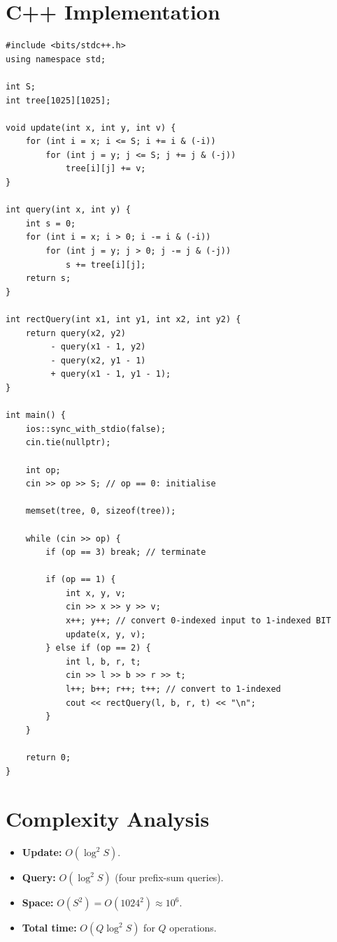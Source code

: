 \documentclass[11pt,a4paper]{article}
\begin{document}
\section{C++ Implementation}

\begin{lstlisting}
#include <bits/stdc++.h>
using namespace std;

int S;
int tree[1025][1025];

void update(int x, int y, int v) {
    for (int i = x; i <= S; i += i & (-i))
        for (int j = y; j <= S; j += j & (-j))
            tree[i][j] += v;
}

int query(int x, int y) {
    int s = 0;
    for (int i = x; i > 0; i -= i & (-i))
        for (int j = y; j > 0; j -= j & (-j))
            s += tree[i][j];
    return s;
}

int rectQuery(int x1, int y1, int x2, int y2) {
    return query(x2, y2)
         - query(x1 - 1, y2)
         - query(x2, y1 - 1)
         + query(x1 - 1, y1 - 1);
}

int main() {
    ios::sync_with_stdio(false);
    cin.tie(nullptr);

    int op;
    cin >> op >> S; // op == 0: initialise

    memset(tree, 0, sizeof(tree));

    while (cin >> op) {
        if (op == 3) break; // terminate

        if (op == 1) {
            int x, y, v;
            cin >> x >> y >> v;
            x++; y++; // convert 0-indexed input to 1-indexed BIT
            update(x, y, v);
        } else if (op == 2) {
            int l, b, r, t;
            cin >> l >> b >> r >> t;
            l++; b++; r++; t++; // convert to 1-indexed
            cout << rectQuery(l, b, r, t) << "\n";
        }
    }

    return 0;
}
\end{lstlisting}

\section{Complexity Analysis}
\begin{itemize}
  \item \textbf{Update:} $O(\log^2 S)$.
  \item \textbf{Query:} $O(\log^2 S)$ (four prefix-sum queries).
  \item \textbf{Space:} $O(S^2) = O(1024^2) \approx 10^6$.
  \item \textbf{Total time:} $O(Q \log^2 S)$ for $Q$ operations.
\end{itemize}
\end{document}
